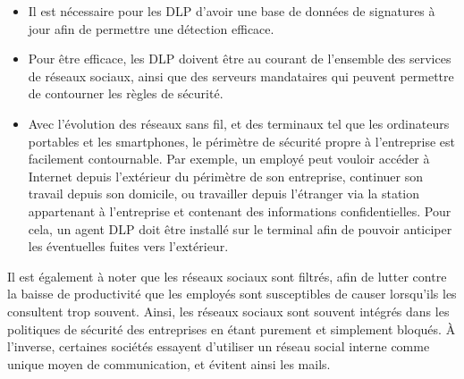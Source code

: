 \begin{itemize}

\item Il est nécessaire pour les DLP d'avoir une base de données de signatures à
jour afin de permettre une détection efficace.

\item Pour être efficace, les DLP doivent être au courant de l'ensemble des
services de réseaux sociaux, ainsi que des serveurs mandataires qui peuvent
permettre de contourner les règles de sécurité.

\item Avec l’évolution des réseaux sans fil, et des terminaux tel que les
ordinateurs portables et les smartphones, le périmètre de sécurité propre à
l’entreprise est facilement contournable. Par exemple, un employé peut vouloir
accéder à Internet depuis l’extérieur du périmètre de son entreprise, continuer
son travail depuis son domicile, ou travailler depuis l’étranger via la station
appartenant à l'entreprise et contenant des informations confidentielles.  Pour
cela, un agent DLP doit être installé sur le terminal afin de pouvoir
anticiper les éventuelles fuites vers l'extérieur. 

\end{itemize}

Il est également à noter que les réseaux sociaux sont filtrés, afin de lutter
contre la baisse de productivité que les employés sont susceptibles de causer
lorsqu'ils les consultent trop souvent. Ainsi, les réseaux sociaux sont
souvent intégrés dans les politiques de sécurité des entreprises en étant
purement et simplement bloqués. À l'inverse, certaines sociétés essayent
d'utiliser un réseau social interne comme unique moyen de communication, et
évitent ainsi les mails.



